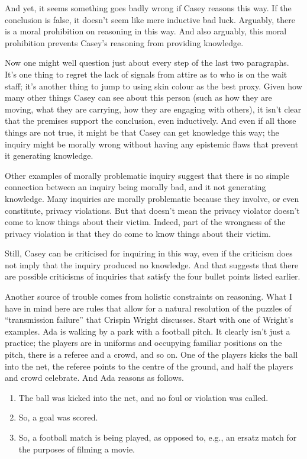 \documentclass[
  11pt,
]{book}
\providecommand{\tightlist}{%
  \setlength{\itemsep}{0pt}\setlength{\parskip}{0pt}}
\begin{document}
And yet, it seems something goes badly wrong if Casey reasons this way. If the conclusion is false, it doesn't seem like mere inductive bad luck. Arguably, there is a moral prohibition on reasoning in this way. And also arguably, this moral prohibition prevents Casey's reasoning from providing knowledge.

Now one might well question just about every step of the last two paragraphs. It's one thing to regret the lack of signals from attire as to who is on the wait staff; it's another thing to jump to using skin colour as the best proxy. Given how many other things Casey can see about this person (such as how they are moving, what they are carrying, how they are engaging with others), it isn't clear that the premises support the conclusion, even inductively. And even if all those things are not true, it might be that Casey can get knowledge this way; the inquiry might be morally wrong without having any epistemic flaws that prevent it generating knowledge.

Other examples of morally problematic inquiry suggest that there is no simple connection between an inquiry being morally bad, and it not generating knowledge. Many inquiries are morally problematic because they involve, or even constitute, privacy violations. But that doesn't mean the privacy violator doesn't come to know things about their victim. Indeed, part of the wrongness of the privacy violation is that they do come to know things about their victim.

Still, Casey can be criticised for inquiring in this way, even if the criticism does not imply that the inquiry produced no knowledge. And that suggests that there are possible criticisms of inquiries that satisfy the four bullet points listed earlier.

Another source of trouble comes from holistic constraints on reasoning. What I have in mind here are rules that allow for a natural resolution of the puzzles of ``transmission failure'' that Crispin Wright \citeyearpar{Wright2002} discusses. Start with one of Wright's examples. Ada is walking by a park with a football pitch. It clearly isn't just a practice; the players are in uniforms and occupying familiar positions on the pitch, there is a referee and a crowd, and so on. One of the players kicks the ball into the net, the referee points to the centre of the ground, and half the players and crowd celebrate. And Ada reasons as follows.

\begin{enumerate}
\def\labelenumi{\arabic{enumi}.}
\tightlist
\item
  The ball was kicked into the net, and no foul or violation was called.
\item
  So, a goal was scored.
\item
  So, a football match is being played, as opposed to, e.g., an ersatz match for the purposes of filming a movie.
\end{enumerate}
\end{document}
